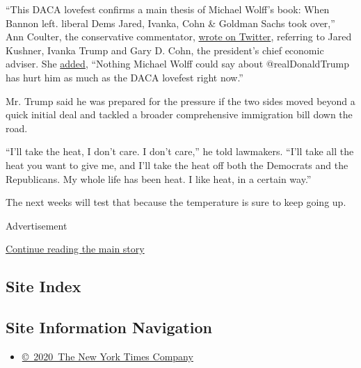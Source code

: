 ``This DACA lovefest confirms a main thesis of Michael Wolff's book:
When Bannon left. liberal Dems Jared, Ivanka, Cohn \& Goldman Sachs took
over,'' Ann Coulter, the conservative commentator,
\href{https://twitter.com/AnnCoulter/status/950796797131227137}{wrote on
Twitter}, referring to Jared Kushner, Ivanka Trump and Gary D. Cohn, the
president's chief economic adviser. She
\href{https://twitter.com/AnnCoulter/status/950798708895027200}{added},
``Nothing Michael Wolff could say about @realDonaldTrump has hurt him as
much as the DACA lovefest right now.''

Mr. Trump said he was prepared for the pressure if the two sides moved
beyond a quick initial deal and tackled a broader comprehensive
immigration bill down the road.

``I'll take the heat, I don't care. I don't care,'' he told lawmakers.
``I'll take all the heat you want to give me, and I'll take the heat off
both the Democrats and the Republicans. My whole life has been heat. I
like heat, in a certain way.''

The next weeks will test that because the temperature is sure to keep
going up.

Advertisement

\protect\hyperlink{after-bottom}{Continue reading the main story}

\hypertarget{site-index}{%
\subsection{Site Index}\label{site-index}}

\hypertarget{site-information-navigation}{%
\subsection{Site Information
Navigation}\label{site-information-navigation}}

\begin{itemize}
\tightlist
\item
  \href{https://help.nytimes3xbfgragh.onion/hc/en-us/articles/115014792127-Copyright-notice}{©~2020~The
  New York Times Company}
\end{itemize}

